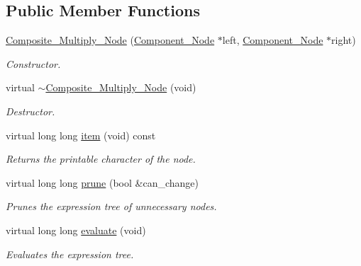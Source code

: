 \subsection*{Public Member Functions}
\begin{DoxyCompactItemize}
\item 
\hyperlink{classMadara_1_1Expression__Tree_1_1Composite__Multiply__Node_a3ceef2c4693641893d4a753bad8ec761}{Composite\_\-Multiply\_\-Node} (\hyperlink{classMadara_1_1Expression__Tree_1_1Component__Node}{Component\_\-Node} $\ast$left, \hyperlink{classMadara_1_1Expression__Tree_1_1Component__Node}{Component\_\-Node} $\ast$right)
\begin{DoxyCompactList}\small\item\em Constructor. \item\end{DoxyCompactList}\item 
virtual \hyperlink{classMadara_1_1Expression__Tree_1_1Composite__Multiply__Node_ab6d664ce102766aaa004d46efbe11858}{$\sim$Composite\_\-Multiply\_\-Node} (void)
\begin{DoxyCompactList}\small\item\em Destructor. \item\end{DoxyCompactList}\item 
virtual long long \hyperlink{classMadara_1_1Expression__Tree_1_1Composite__Multiply__Node_a51755bc032a96130f1ab893ad1c84eca}{item} (void) const 
\begin{DoxyCompactList}\small\item\em Returns the printable character of the node. \item\end{DoxyCompactList}\item 
virtual long long \hyperlink{classMadara_1_1Expression__Tree_1_1Composite__Multiply__Node_ab01ac436816d007000456fc3962241b8}{prune} (bool \&can\_\-change)
\begin{DoxyCompactList}\small\item\em Prunes the expression tree of unnecessary nodes. \item\end{DoxyCompactList}\item 
virtual long long \hyperlink{classMadara_1_1Expression__Tree_1_1Composite__Multiply__Node_a69d7d0d06143d829208b6bf530bafbc9}{evaluate} (void)
\begin{DoxyCompactList}\small\item\em Evaluates the expression tree. \item\end{DoxyCompactList}\item 

\end{DoxyCompactItemize}
